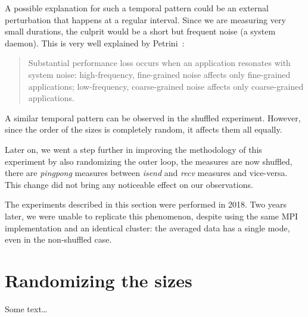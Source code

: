         A possible explanation for such a temporal pattern could be an external perturbation that happens at a regular
        interval. Since we are measuring very small durations, the culprit would be a short but frequent noise (\eg a
        system daemon). This is very well explained by Petrini~\etal\cite{Petrini_2003}:
        \begin{quote}
            Substantial performance loss occurs when an application resonates with system noise: high-frequency,
            fine-grained noise affects only fine-grained applications; low-frequency, coarse-grained noise affects only
            coarse-grained applications.
        \end{quote}

        A similar temporal pattern can be observed in the shuffled experiment. However, since the order of the sizes is
        completely random, it affects them all equally.

        Later on, we went a step further in improving the methodology of this experiment by also randomizing the outer
        loop, \ie the measures are now shuffled, there are \emph{pingpong} measures between \emph{isend} and \emph{recv}
        measures and vice-versa. This change did not bring any noticeable effect on our observations.

        The experiments described in this section were performed in 2018. Two years later, we were unable to replicate
        this phenomenon, despite using the same MPI implementation and an identical cluster: the averaged data has a
        single mode, even in the non-shuffled case.

    \section{Randomizing the sizes}%
    \label{sec:randomizing_sizes}
        Some text\dots

